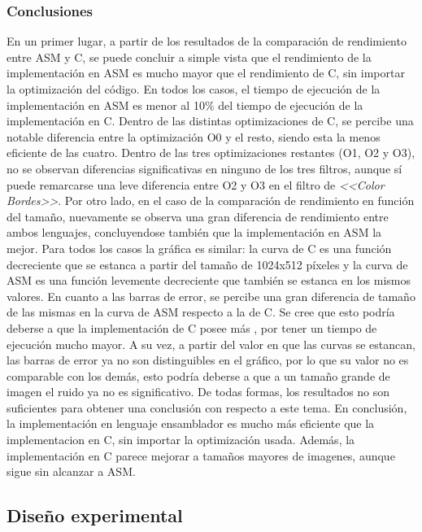 \documentclass[a4paper]{article}
\begin{document}
\subsubsection{Conclusiones}
\justify 
En un primer lugar, a partir de los resultados de la comparación de rendimiento entre ASM y C, se puede concluir a simple vista que el rendimiento de la implementación en ASM es mucho mayor que el rendimiento de C, sin importar la optimización del código. En todos los casos, el tiempo de ejecución de la implementación en ASM es menor al 10\% del tiempo de ejecución de la implementación en C. Dentro de las distintas optimizaciones de C, se percibe una notable diferencia entre la optimización O0 y el resto, siendo esta la menos eficiente de las cuatro. Dentro de las tres optimizaciones restantes (O1, O2 y O3), no se observan diferencias significativas en ninguno de los tres filtros, aunque sí puede remarcarse una leve diferencia entre O2 y O3 en el filtro de \textit{<<Color Bordes>>}.
\justify 
Por otro lado, en el caso de la comparación de rendimiento en función del tamaño, nuevamente se observa una gran diferencia de rendimiento entre ambos lenguajes, concluyendose también que la implementación en ASM la mejor. Para todos los casos la gráfica es similar: la curva de C es una función decreciente que se estanca a partir del tamaño de 1024x512 píxeles y la curva de ASM es una función levemente decreciente que también se estanca en los mismos valores. En cuanto a las barras de error, se percibe una gran diferencia de tamaño de las mismas en la curva de ASM respecto a la de C. Se cree que esto podría deberse a que la implementación de C posee más , por tener un tiempo de ejecución mucho mayor. A su vez, a partir del valor en que las curvas se estancan, las barras de error ya no son distinguibles en el gráfico, por lo que su valor no es comparable con los demás, esto podría deberse a que a un tamaño grande de imagen el ruido ya no es significativo. De todas formas, los resultados no son suficientes para obtener una conclusión con respecto a este tema.
\justify En conclusión, la implementación en lenguaje ensamblador es mucho más eficiente que la implementacion en C, sin importar la optimización usada. Además, la implementación en C parece mejorar a tamaños mayores de imagenes, aunque sigue sin alcanzar a ASM.

      

\subsection{Diseño experimental}
\end{document}

